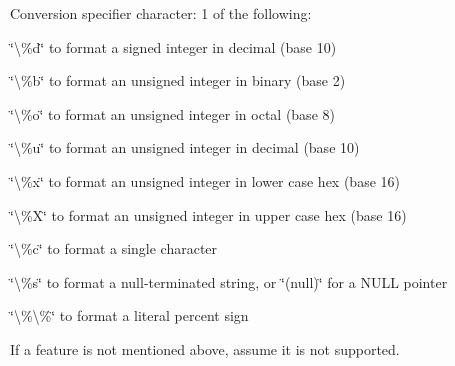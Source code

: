 \begin{DoxyEnumerate}
\begin{DoxyItemize}
\end{DoxyItemize}
\item Conversion specifier character\-: 1 of the following\-:
\begin{DoxyItemize}
\item {\ttfamily \char`\"{}\textbackslash{}\%d\char`\"{}} to format a signed integer in decimal (base 10)
\item {\ttfamily \char`\"{}\textbackslash{}\%b\char`\"{}} to format an unsigned integer in binary (base 2)
\item {\ttfamily \char`\"{}\textbackslash{}\%o\char`\"{}} to format an unsigned integer in octal (base 8)
\item {\ttfamily \char`\"{}\textbackslash{}\%u\char`\"{}} to format an unsigned integer in decimal (base 10)
\item {\ttfamily \char`\"{}\textbackslash{}\%x\char`\"{}} to format an unsigned integer in lower case hex (base 16)
\item {\ttfamily \char`\"{}\textbackslash{}\%\-X\char`\"{}} to format an unsigned integer in upper case hex (base 16)
\item {\ttfamily \char`\"{}\textbackslash{}\%c\char`\"{}} to format a single character
\item {\ttfamily \char`\"{}\textbackslash{}\%s\char`\"{}} to format a null-\/terminated string, or \char`\"{}(null)\char`\"{} for a {\ttfamily N\-U\-L\-L} pointer
\item {\ttfamily \char`\"{}\textbackslash{}\%\textbackslash{}\%\char`\"{}} to format a literal percent sign
\end{DoxyItemize}
\end{DoxyEnumerate}

If a feature is not mentioned above, assume it is not supported.


